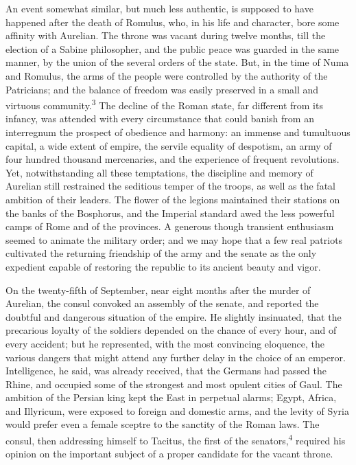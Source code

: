 An event somewhat similar, but much less authentic, is supposed
to have happened after the death of Romulus, who, in his life and
character, bore some affinity with Aurelian. The throne was
vacant during twelve months, till the election of a Sabine
philosopher, and the public peace was guarded in the same manner,
by the union of the several orders of the state. But, in the time
of Numa and Romulus, the arms of the people were controlled by
the authority of the Patricians; and the balance of freedom was
easily preserved in a small and virtuous community.\textsuperscript{3} The decline
of the Roman state, far different from its infancy, was attended
with every circumstance that could banish from an interregnum the
prospect of obedience and harmony: an immense and tumultuous
capital, a wide extent of empire, the servile equality of
despotism, an army of four hundred thousand mercenaries, and the
experience of frequent revolutions. Yet, notwithstanding all
these temptations, the discipline and memory of Aurelian still
restrained the seditious temper of the troops, as well as the
fatal ambition of their leaders. The flower of the legions
maintained their stations on the banks of the Bosphorus, and the
Imperial standard awed the less powerful camps of Rome and of the
provinces. A generous though transient enthusiasm seemed to
animate the military order; and we may hope that a few real
patriots cultivated the returning friendship of the army and the
senate as the only expedient capable of restoring the republic to
its ancient beauty and vigor.


On the twenty-fifth of September, near eight months after the
murder of Aurelian, the consul convoked an assembly of the
senate, and reported the doubtful and dangerous situation of the
empire. He slightly insinuated, that the precarious loyalty of
the soldiers depended on the chance of every hour, and of every
accident; but he represented, with the most convincing eloquence,
the various dangers that might attend any further delay in the
choice of an emperor. Intelligence, he said, was already
received, that the Germans had passed the Rhine, and occupied
some of the strongest and most opulent cities of Gaul. The
ambition of the Persian king kept the East in perpetual alarms;
Egypt, Africa, and Illyricum, were exposed to foreign and
domestic arms, and the levity of Syria would prefer even a female
sceptre to the sanctity of the Roman laws. The consul, then
addressing himself to Tacitus, the first of the senators,\textsuperscript{4}
required his opinion on the important subject of a proper
candidate for the vacant throne.

